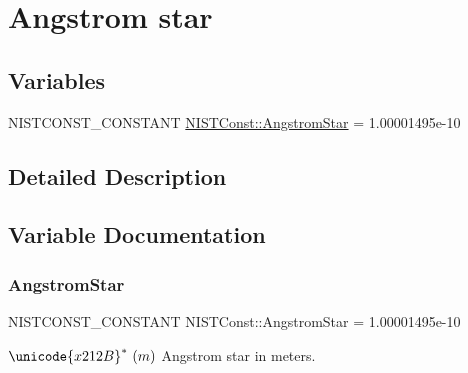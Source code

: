 \hypertarget{group___n_i_s_t_const-_angstrom_star}{}\section{Angstrom star}
\label{group___n_i_s_t_const-_angstrom_star}
\subsection*{Variables}
\begin{DoxyCompactItemize}
\item 
N\+I\+S\+T\+C\+O\+N\+S\+T\+\_\+\+C\+O\+N\+S\+T\+A\+NT \mbox{\hyperlink{group___n_i_s_t_const-_angstrom_star_gaa47cd1d17183280540df63d68ceb8aac}{N\+I\+S\+T\+Const\+::\+Angstrom\+Star}} = 1.\+00001495e-\/10
\end{DoxyCompactItemize}


\subsection{Detailed Description}


\subsection{Variable Documentation}
\mbox{\label{group___n_i_s_t_const-_angstrom_star_gaa47cd1d17183280540df63d68ceb8aac}} 
\subsubsection{\texorpdfstring{Angstrom\+Star}{AngstromStar}}
{\footnotesize\ttfamily N\+I\+S\+T\+C\+O\+N\+S\+T\+\_\+\+C\+O\+N\+S\+T\+A\+NT N\+I\+S\+T\+Const\+::\+Angstrom\+Star = 1.\+00001495e-\/10}

$\unicode{x212B}^{\ast} \ (m)$ Angstrom star in meters. 